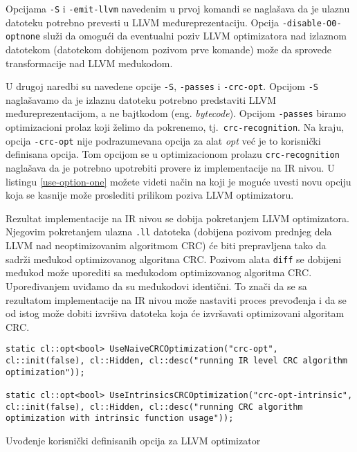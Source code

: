 \documentclass[12pt,oneside]{memoir}
\begin{document}
Opcijama \texttt{-S} i \texttt{-emit-llvm} navedenim u prvoj komandi se naglašava da je ulaznu datoteku potrebno prevesti u LLVM međureprezentaciju. Opcija \texttt{-disable-O0-optnone} služi da omogući da eventualni poziv LLVM optimizatora nad izlaznom datotekom (datotekom dobijenom pozivom prve komande) može da sprovede transformacije nad LLVM međukodom. 

U drugoj naredbi su navedene opcije \texttt{-S}, \texttt{-passes} i \texttt{-crc-opt}. Opcijom \texttt{-S} naglašavamo da je izlaznu datoteku potrebno predstaviti LLVM međureprezentacijom, a ne bajtkodom (eng. \textit{bytecode}). Opcijom \texttt{-passes} biramo optimizacioni prolaz koji želimo da pokrenemo, tj.~\texttt{crc-recognition}. Na kraju, opcija \texttt{-crc-opt} nije podrazumevana opcija za alat \textit{opt} već je to korisnički definisana opcija. Tom opcijom se u optimizacionom prolazu \texttt{crc-recognition} naglašava da je potrebno upotrebiti provere iz implementacije na IR nivou. U listingu \ref{use-option-one} možete videti način na koji je moguće uvesti novu opciju koja se kasnije može proslediti prilikom poziva LLVM optimizatoru.

Rezultat implementacije na IR nivou se dobija pokretanjem LLVM optimizatora.
Njegovim pokretanjem ulazna \texttt{.ll} datoteka (dobijena pozivom prednjeg dela LLVM nad neoptimizovanim algoritmom CRC) će biti prepravljena tako da sadrži međukod optimizovanog algoritma CRC. Pozivom alata \texttt{diff} se dobijeni međukod može uporediti sa međukodom optimizovanog algoritma CRC. 
Upoređivanjem uviđamo da su međukodovi identični. To znači da se sa rezultatom implementacije na IR nivou može nastaviti proces prevođenja i da se od istog može dobiti izvršiva datoteka koja će izvršavati optimizovani algoritam CRC.


\begin{listing}[!ht]
\begin{verbatim}
static cl::opt<bool> UseNaiveCRCOptimization("crc-opt", cl::init(false), cl::Hidden, cl::desc("running IR level CRC algorithm optimization"));

static cl::opt<bool> UseIntrinsicsCRCOptimization("crc-opt-intrinsic", cl::init(false), cl::Hidden, cl::desc("running CRC algorithm optimization with intrinsic function usage"));
\end{verbatim}
\caption{Uvođenje korisnički definisanih opcija za LLVM optimizator}
\centering
\label{use-option-one}
\end{listing}
\end{document}
